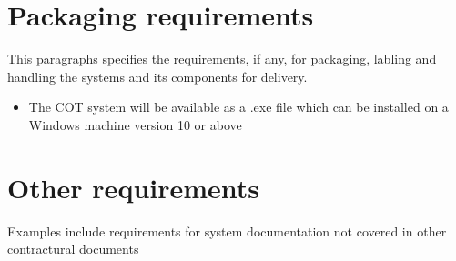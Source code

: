

\section{Packaging requirements}
This paragraphs specifies the requirements, if any, for packaging, labling and handling the systems and its components for delivery.

\begin{itemize}
	\item The COT system will be available as a .exe file which can be installed on a Windows machine version 10 or above
\end{itemize}

\section{Other requirements}
Examples include requirements for system documentation
not covered in other contractural documents